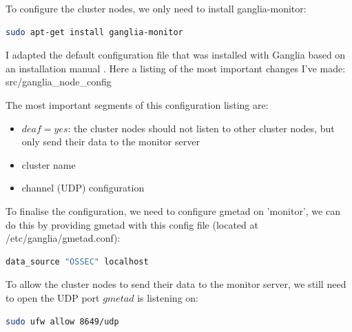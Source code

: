 \documentclass[12pt]{report}
\begin{document}
To configure the cluster nodes, we only need to install ganglia-monitor:
\begin{lstlisting}[language=bash]
sudo apt-get install ganglia-monitor
\end{lstlisting} 

I adapted the
default configuration file that was installed with Ganglia based on an
 installation manual \cite{ganglia_install_manual}.
Here a listing of the most important changes I've made:
src/ganglia\_node\_config

The most important segments of this configuration listing are:
\begin{itemize}
\item $deaf = yes$: the cluster nodes should not listen to other
  cluster nodes, but only send their data to the monitor server
\item cluster name
\item channel (UDP) configuration
\end{itemize}

To finalise the configuration, we need to configure gmetad on
'monitor', we can do this by providing gmetad with this config file
(located at /etc/ganglia/gmetad.conf):
\begin{lstlisting}[language=bash]
data_source "OSSEC" localhost
\end{lstlisting} 

To allow the cluster nodes to send their data to the monitor server,
we still need to open the UDP port $gmetad$ is listening on:
 \begin{lstlisting}[language=bash]
sudo ufw allow 8649/udp
\end{lstlisting} 
\end{document}
